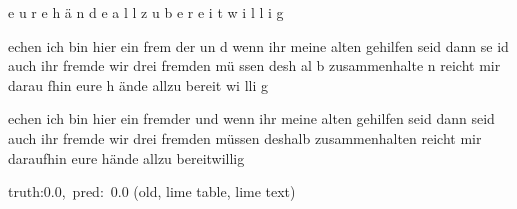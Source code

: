 \documentclass[a4paper,10pt,twoside]{article}
\begin{document}
{\color[rgb]{0.0,0,0} e}{\color[rgb]{0.0,0,0} u}{\color[rgb]{0.0,0,0} r}{\color[rgb]{0.0,0,0} e} {\color[rgb]{0.0,0,0} h}{\color[rgb]{0.0,0,0} ä}{\color[rgb]{0.0,0,0} n}{\color[rgb]{0.0,0,0} d}{\color[rgb]{0.0,0,0} e}   {\color[rgb]{0.0,0,0} a}{\color[rgb]{0.0,0,0} l}{\color[rgb]{0.0,0,0} l}{\color[rgb]{0.0,0,0} z}{\color[rgb]{0.0,0,0} u} {\color[rgb]{0.0,0,0} b}{\color[rgb]{0.0,0,0} e}{\color[rgb]{0.0,0,0} r}{\color[rgb]{0.0,0,0} e}{\color[rgb]{0.0,0,0} i}{\color[rgb]{0.0,0,0} t}{\color[rgb]{0.0,0,0} w}{\color[rgb]{0.0,0,0} i}{\color[rgb]{0.0,0,0} l}{\color[rgb]{0.0,0,0} l}{\color[rgb]{0.0,0,0} i}{\color[rgb]{0.0,0,0} g}

echen  ich bin hier ein {\color[rgb]{1,0,0} f}rem{\color[rgb]{1,0,0} d}er  un{\color[rgb]{1,0,0} d} wenn ihr meine alten gehilfen seid  dann se{\color[rgb]{1,0,0} i}d auch ihr {\color[rgb]{0,0,1} f}remde  {\color[rgb]{0,0,1} w}ir drei fremden {\color[rgb]{0,0,1} m}ü{\color[rgb]{1,0,0} s}sen desh{\color[rgb]{0,0,1} a}l{\color[rgb]{1,0,0} b} {\color[rgb]{1,0,0} z}usammenhalte{\color[rgb]{1,0,0} n}  reicht mir darau{\color[rgb]{0,0,1} f}hin eure h{\color[rgb]{1,0,0} ä}nde   allzu bereit{\color[rgb]{1,0,0} w}i{\color[rgb]{0,0,1} l}li{\color[rgb]{0,0,1} g}

 echen ich bin hier ein fremder und wenn ihr meine alten {\color[rgb]{0,0,1} gehilfen} seid dann seid auch ihr fremde wir drei fremden {\color[rgb]{0,0,1} müssen} deshalb zusammenhalten {\color[rgb]{0,0,1} reicht} mir daraufhin {\color[rgb]{0,0,1} eure} {\color[rgb]{0,0,1} hände} allzu bereitwillig

 {\footnotesize {\color[rgb]{0.6, 0.6, 0.6}truth:0.0,~pred:~0.0}} (old, lime table, lime text)\hrulefill
\end{document}
